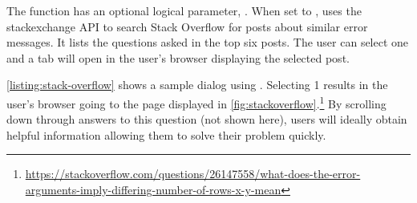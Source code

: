 %

%

The  function has an optional logical parameter, .  When set to ,  uses the stackexchange API to search Stack Overflow for posts about similar error messages.  
It lists the questions asked in the top six posts.  The user can select one and a tab will open in the user's browser displaying the selected post.


\autoref{listing:stack-overflow} shows a sample dialog using .  Selecting 1 results in the user's browser going to the page displayed in \autoref{fig:stackoverflow}.\footnote{\url{    https://stackoverflow.com/questions/26147558/what-does-the-error-arguments-imply-differing-number-of-rows-x-y-mean}}  By scrolling down through answers to this question (not shown here), users will ideally obtain helpful information allowing them to solve their problem quickly.

%

